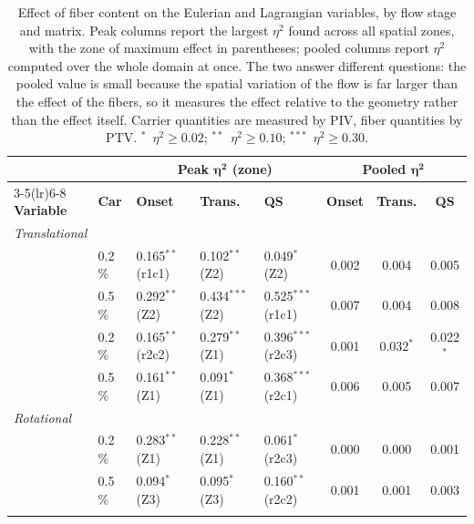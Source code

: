 \documentclass[%
  aip,
  pof,          %
  reprint,      %
  floatfix
]{revtex4-2}
\begin{document}
\begin{table}[htb]
\centering
\caption{Effect of fiber content on the Eulerian and Lagrangian variables, by flow stage and matrix. Peak columns report the largest $\eta^{2}$ found across all spatial zones, with the zone of maximum effect in parentheses; pooled columns report $\eta^{2}$ computed over the whole domain at once. The two answer different questions: the pooled value is small because the spatial variation of the flow is far larger than the effect of the fibers, so it measures the effect relative to the geometry rather than the effect itself. Carrier quantities are measured by PIV, fiber quantities by PTV. $^{*}$~$\eta^{2} \geq 0.02$;\; $^{**}$~$\eta^{2} \geq 0.10$;\; $^{***}$~$\eta^{2} \geq 0.30$.}
\label{tab:ancova_combined}
\small
\setlength{\tabcolsep}{4pt}
\begin{tabular}{l l l l l c c c}
\toprule
 & & \multicolumn{3}{c}{\textbf{Peak} $\boldsymbol{\eta^{2}}$ \textbf{(zone)}}
   & \multicolumn{3}{c}{\textbf{Pooled} $\boldsymbol{\eta^{2}}$} \\
\cmidrule(lr){3-5}\cmidrule(lr){6-8}
\textbf{Variable} & \textbf{Car}
  & \textbf{Onset} & \textbf{Trans.} & \textbf{QS}
  & \textbf{Onset} & \textbf{Trans.} & \textbf{QS} \\
\midrule
\multicolumn{8}{l}{\textit{Translational}} \\
\addlinespace[1pt]
\multirow{2}{*}{$|\mathbf{u}|$ \; carrier}
  & 0.2\,\% & 0.165$^{**}$ (r1c1) & 0.102$^{**}$ (Z2)   & 0.049$^{*}$ (Z2)    & 0.002 & 0.004 & 0.005 \\
  & 0.5\,\% & 0.292$^{**}$ (Z2)   & 0.434$^{***}$ (Z2)  & 0.525$^{***}$ (r1c1) & 0.007 & 0.004 & 0.008 \\
\addlinespace[2pt]
\multirow{2}{*}{$|\mathbf{v}|$ \; fiber}
  & 0.2\,\% & 0.165$^{**}$ (r2c2) & 0.279$^{**}$ (Z1)   & 0.396$^{***}$ (r2c3) & 0.001 & 0.032$^{*}$ & 0.022$^{*}$ \\
  & 0.5\,\% & 0.161$^{**}$ (Z1)   & 0.091$^{*}$ (Z1)    & 0.368$^{***}$ (r2c1) & 0.006 & 0.005 & 0.007 \\
\midrule
\multicolumn{8}{l}{\textit{Rotational}} \\
\addlinespace[1pt]
\multirow{2}{*}{$|\zeta|$ \; carrier}
  & 0.2\,\% & 0.283$^{**}$ (Z1)   & 0.228$^{**}$ (Z1)   & 0.061$^{*}$ (r2c3)   & 0.000 & 0.000 & 0.001 \\
  & 0.5\,\% & 0.094$^{*}$ (Z3)    & 0.095$^{*}$ (Z3)    & 0.160$^{**}$ (r2c2)  & 0.001 & 0.001 & 0.003 \\
\addlinespace[2pt]
\multirow{2}{*}{$|\omega|$ \; fiber}

\end{tabular}
\end{table}
\end{document}
